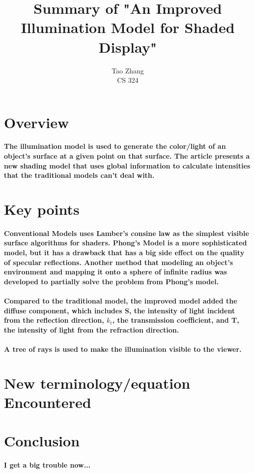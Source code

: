 \documentclass[12pt]{article}
\begin{document}
\title{Summary of "An Improved Illumination Model for Shaded Display"}

\author{Tao Zhang\\
CS 324}

\maketitle


\section{Overview}
\paragraph{The illumination model is used to generate the color/light of an object’s surface at a given point on that surface. The article presents a new shading model that uses global information to calculate intensities that the traditional models can't deal with.}

\section{Key points}
\paragraph{Conventional Models uses Lamber's consine law as the simplest visible surface algorithms for shaders. Phong's Model is a more sophisticated model, but it has a drawback that has a big side effect on the quality of specular reflections. Another method that modeling an object's environment and mapping it onto a sphere of infinite radius was developed to partially solve the problem from Phong's model. }

\paragraph{Compared to the traditional model, the improved model added the diffuse component, which includes S, the intensity of light incident from the reflection direction, $k_t$, the transmission coefficient, and T, the intensity of light from the refraction direction. }


\paragraph{A tree of rays is used to make the illumination visible to the viewer.}

\section{New terminology/equation Encountered}
\paragraph{}

\section{Conclusion}
\paragraph{I get a big trouble now...}
\end{document}
